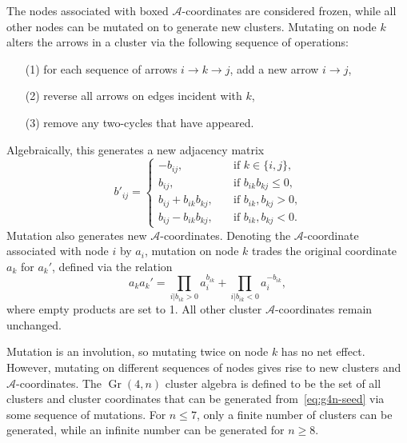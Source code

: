 \documentclass[11pt]{article}
\DeclareMathOperator{\Gr}{Gr}
\def\a{\mathcal{A}}
\begin{document}
The nodes associated with boxed $\a$-coordinates are considered frozen, while all other nodes can be mutated on to generate new clusters. Mutating on node $k$ alters the arrows in a cluster via the following sequence of operations:
\begin{itemize}
	\item[(1)] for each sequence of arrows $i\to k \to j$, add a new arrow $i\to j$,
	\item[(2)] reverse all arrows on edges incident with $k$,
	\item[(3)] remove any two-cycles that have appeared.
\end{itemize}
Algebraically, this generates a new adjacency matrix 
\begin{equation}
  \label{eq:b-mutation}
  b'_{i j} =
  \begin{cases}
    -b_{i j}, &\quad \text{if $k \in \lbrace i, j\rbrace$,}\\
    b_{i j}, &\quad \text{if $b_{i k} b_{k j} \leq 0$,}\\
    b_{i j} + b_{i k} b_{k j}, &\quad \text{if $b_{i k}, b_{k j} > 0$,}\\
    b_{i j} - b_{i k} b_{k j}, &\quad \text{if $b_{i k}, b_{k j} < 0$.}
  \end{cases}
\end{equation}
Mutation also generates new $\a$-coordinates. Denoting the $\a$-coordinate associated with node $i$ by $a_i$, mutation on node $k$ trades the original coordinate $a_k$ for $a_k'$, defined via the relation
\begin{equation}
  \label{eq:a-coord-mutation}
  a_{k} a_{k}' = \prod_{i \vert b_{i k} > 0} a_{i}^{b_{i k}} + \prod_{i \vert b_{i k} < 0} a_{i}^{-b_{i k}},
\end{equation} 
where empty products are set to 1. All other cluster $\a$-coordinates remain unchanged. 

Mutation is an involution, so mutating twice on node $k$ has no net effect. However, mutating on different sequences  of nodes gives rise to new clusters and $\a$-coordinates. The $\Gr(4,n)$ cluster algebra is defined to be the set of all clusters and cluster coordinates that can be generated from~\eqref{eq:g4n-seed} via some sequence of mutations. For $n \le 7$, only a finite number of clusters can be generated, while an infinite number can be generated for $n\ge8$. 
\end{document}
